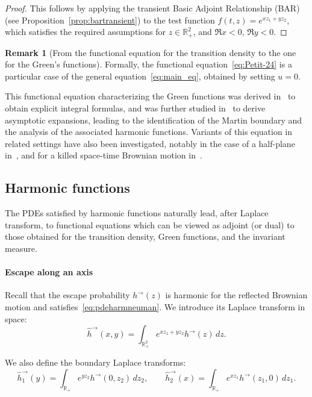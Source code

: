 \documentclass[11pt]{article}
\newcommand\citeS[1]{\cite{#1}}
\theoremstyle{definition}
\newtheorem{rem}[thm]{Remark}
\begin{document}
\begin{proof}
This follows by applying the transient Basic Adjoint Relationship (BAR) (see Proposition~\ref{prop:bartransient}) to the test function $f(t,z)=e^{x z_1+y z_2}$, which satisfies the required assumptions for $z\in\mathbb{R}_+^2$, and $\Re x<0$, $\Re y<0$.
\end{proof}
\begin{rem}[From the functional equation for the transition density to the one for the Green's functions] Formally, the functional equation~\eqref{eq:Petit-24} is a particular case of the general equation~\eqref{eq:main_eq}, obtained by setting $u=0$.
\end{rem}
This functional equation characterizing the Green functions was derived in~\citeS{franceschi_green_2021} to obtain explicit integral formulas, and was further studied in~\cite{franceschi_kourkova_petit_asymptotics_2024} to derive asymptotic expansions, leading to the identification of the Martin boundary and the analysis of the associated harmonic functions.
Variants of this equation in related settings have also been investigated, notably in the case of a half-plane in~\citeS{franceschi_ernst_asymptotic_2021}, and for a killed space-time Brownian motion in~\citeS{franceschi_spacetime_2024}.

\subsection{Harmonic functions}

The PDEs satisfied by harmonic functions naturally lead, after Laplace transform, to functional equations which can be viewed as adjoint (or dual) to those obtained for the transition density, Green functions, and the invariant measure.

\paragraph{Escape along an axis}

Recall that the escape probability $h^\rightarrow(z)$ is harmonic for the reflected Brownian motion and satisfies~\eqref{eq:pdeharmneuman}. We introduce its Laplace transform in space:
\begin{equation}
\label{eq:Lap_h}
\widehat h^\rightarrow(x,y)
=
\int_{\mathbb R_+^2} e^{x z_1 + y z_2} h^\rightarrow(z)\,dz.
\end{equation}

We also define the boundary Laplace transforms:
\begin{equation}
\label{eq:Lap_h1}
\widehat h^\rightarrow_1(y)
=
\int_{\mathbb R_+} e^{y z_2} h^\rightarrow(0,z_2)\,dz_2,
\qquad
\widehat h^\rightarrow_2(x)
=
\int_{\mathbb R_+} e^{x z_1} h^\rightarrow(z_1,0)\,dz_1.
\end{equation}
\end{document}
